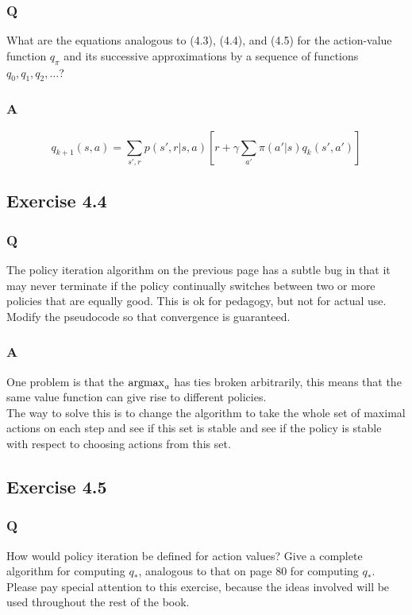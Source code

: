 \subsubsection*{Q}
What are the equations analogous to (4.3), (4.4), and (4.5) for the action-value function $q_\pi$ and its successive approximations by a sequence of functions $q_0, q_1, q_2, \dots$?

\subsubsection*{A}
\begin{equation}
    q_{k+1}(s, a) = \sum_{s', r} p(s', r | s, a)\left[r + \gamma \sum_{a'} \pi(a'|s)q_k(s', a')\right]
\end{equation}

\subsection{Exercise 4.4}
\subsubsection*{Q}
The policy iteration algorithm on the previous page has a subtle bug in that it may never terminate if the policy continually switches between two or more policies that are equally good. This is ok for pedagogy, but not for actual use. Modify the pseudocode so that convergence is guaranteed.

\subsubsection*{A}
One problem is that the $\operatorname*{argmax}_a$ has ties broken arbitrarily, this means that the same value function can give rise to different policies.\\

The way to solve this is to change the algorithm to take the whole set of maximal actions on each step and see if this set is stable and see if the policy is stable with respect to choosing actions from this set.


\subsection{Exercise 4.5}
\subsubsection*{Q}
How would policy iteration be defined for action values? Give a complete algorithm for computing $q_*$, analogous to that on page 80 for computing $q_*$. Please pay special attention to this exercise, because the ideas involved will be used throughout the rest of the book.

